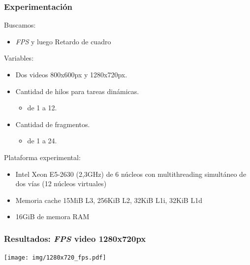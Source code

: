 \documentclass[11pt,a4paper,spanish]{beamer}
\begin{document}
\begin{frame}

\frametitle{Experimentación}

Buscamos:

\begin{itemize}

	\item \emph{FPS} y luego Retardo de cuadro

\end{itemize}

Variables:

\begin{itemize}

	\item Dos videos 800x600px y 1280x720px.

	\item Cantidad de hilos para tareas dinámicas.

	\begin{itemize}

	\item de 1 a 12.

	\end{itemize}

	\item Cantidad de fragmentos.

	\begin{itemize}

	\item de 1 a 24.

	\end{itemize}

\end{itemize}

Plataforma experimental:

\begin{itemize}

	\item Intel Xeon E5-2630 (2,3GHz) de 6 núcleos con multithreading
		simultáneo de dos vías (12 núcleos virtuales)

	\item Memoria cache 15MiB L3, 256KiB L2, 32KiB L1i, 32KiB L1d

	\item 16GiB de memora RAM

\end{itemize}

\end{frame}

\begin{frame}

\frametitle{Resultados: \emph{FPS} video 1280x720px}

\texttt{[image: img/1280x720\_fps.pdf]}

\end{frame}
\end{document}
